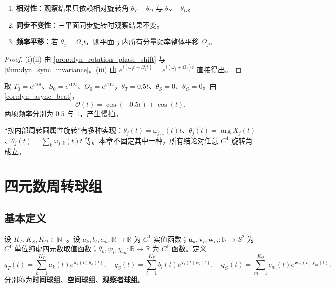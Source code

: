 \begin{property}[旋转三平面的基本性质]\label{prop:dyn_rotating_planes_properties}
\begin{enumerate}[label=(\roman*)]
    \item \textbf{相对性}：观察结果只依赖相对旋转角 $\theta_T-\theta_O$ 与 $\theta_S-\theta_O$。
    \item \textbf{同步不变性}：三平面同步旋转时观察结果不变。
    \item \textbf{频率平移}：若 $\theta_j=\Omega_j t$，则平面 $j$ 内所有分量频率整体平移 $\Omega_j$。
\end{enumerate}
\end{property}

\begin{proof}
(i)(ii) 由 \cref{prop:dyn_rotation_phase_shift} 与 \cref{thm:dyn_sync_invariance}。(iii) 由 $e^{i(\omega_j t+\Omega_j t)}=e^{i(\omega_j+\Omega_j)t}$ 直接得出。
\end{proof}

\begin{example}[三平面异步旋转的拍频实例]\label{ex:dyn_rotating_planes_example}
取 $T_0=e^{i10t}$、$S_0=e^{i12t}$、$O_0=e^{i11t}$，$\theta_T=0.5t$、$\theta_S=0$、$\theta_O=0$。由 \cref{cor:dyn_async_beat}，
\[
\mathcal O(t)=\cos(-0.5t)+\cos(t).
\]
两项频率分别为 $0.5$ 与 $1$，产生慢拍。
\end{example}

\begin{remark}[旋转角的选择]\label{rem:dyn_rotation_angle_choice}
“按内部周转圆属性旋转”有多种实现：$\theta_j(t)=\omega_{j,1}(t)t$、$\theta_j(t)=\arg X_j(t)$、$\theta_j(t)=\sum_k\omega_{j,k}(t)t$ 等。本章不固定其中一种，所有结论对任意 $C^1$ 旋转角成立。
\end{remark}

\section{四元数周转球组}
\label{sec:dyn_quaternion_single}

\subsection{基本定义}

\begin{definition}[四元数周转球组]\label{def:dyn_quaternion_group}
设 $K_T,K_S,K_O\in\mathbb N^+$。设 $a_k,b_l,c_m:\mathbb R\to\mathbb R$ 为 $C^1$ 实值函数；$\mathbf u_k,\mathbf v_l,\mathbf w_m:\mathbb R\to S^2$ 为 $C^1$ 单位纯虚四元数取值函数；$\theta_k,\psi_l,\chi_m:\mathbb R\to\mathbb R$ 为 $C^1$ 函数。定义
\[
q_T(t)=\sum_{k=1}^{K_T}a_k(t)e^{\mathbf u_k(t)\theta_k(t)},\quad
q_S(t)=\sum_{l=1}^{K_S}b_l(t)e^{\mathbf v_l(t)\psi_l(t)},\quad
q_O(t)=\sum_{m=1}^{K_O}c_m(t)e^{\mathbf w_m(t)\chi_m(t)}.
\]
分别称为\textbf{时间球组}、\textbf{空间球组}、\textbf{观察者球组}。
\end{definition}

